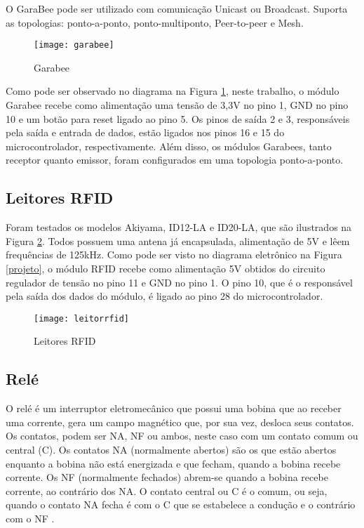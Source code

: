\documentclass[tcc,capa]{texufpel}
\begin{document}
            O GaraBee pode ser utilizado com comunicação Unicast ou Broadcast. Suporta as topologias: ponto-a-ponto, ponto-multiponto, Peer-to-peer e Mesh.
            
            \begin{figure}[H]
                \centering 
                \texttt{[image: garabee]}
                \caption{Garabee} 
                \label{garabee}
            \end{figure}
            
            Como pode ser observado no diagrama na Figura \ref{garabee}, neste trabalho, o módulo Garabee recebe como alimentação uma tensão de 3,3V no pino 1, GND no pino 10 e um botão para reset ligado ao pino 5.
            Os pinos de saída 2 e 3, responsáveis pela saída e entrada de dados, estão ligados nos pinos 16 e 15 do microcontrolador, respectivamente.
            Além disso, os módulos Garabees, tanto receptor quanto emissor, foram configurados em uma topologia ponto-a-ponto.
    
    
        \subsection{Leitores RFID}
        
            Foram testados os modelos Akiyama, ID12-LA e ID20-LA, que são ilustrados na Figura \ref{leitores}. Todos possuem uma antena já encapsulada, alimentação de 5V e lêem frequências de 125kHz. Como pode ser visto no diagrama eletrônico na Figura \ref{projeto}, o módulo RFID recebe como alimentação 5V obtidos do circuito regulador de tensão no pino 11 e GND no pino 1. O pino 10, que é o responsável pela saída dos dados do módulo, é ligado ao pino 28 do microcontrolador.
            
             \begin{figure}[H]
                \centering 
                \texttt{[image: leitorrfid]}
                \caption{Leitores RFID} 
                \label{leitores}
            \end{figure}
           
        \subsection{Relé}
        
            O relé é um interruptor eletromecânico que possui uma bobina que ao receber uma corrente, gera um campo magnético que, por sua vez, desloca seus contatos. Os contatos, podem ser NA, NF ou ambos, neste caso com um contato comum ou central (C). Os contatos NA (normalmente abertos) são os que estão abertos enquanto a bobina não está energizada e que fecham, quando a bobina recebe corrente.
            Os NF (normalmente fechados) abrem-se quando a bobina recebe corrente, ao contrário dos NA. O contato central ou C é o comum, ou seja, quando o contato NA fecha é com o C que se estabelece a condução e o contrário com o NF \cite{Info:2015:Online}.
            
\end{document}
